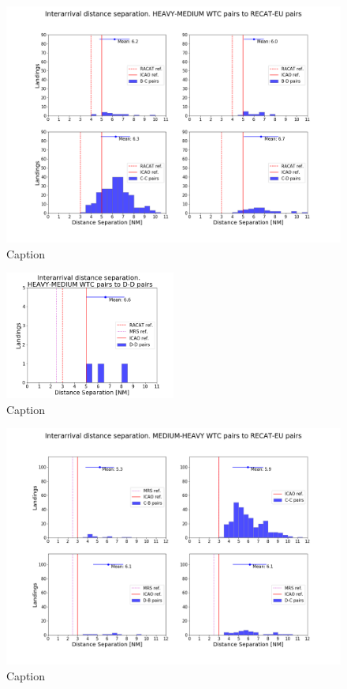\begin{figure}[h]
    \centering
    \includegraphics[width=1\textwidth]{graphics/fig_HM_to_RECAT_pairs_dist_separ.png}
    \caption[list of figures caption]{Caption}
    \label{fig:HM_to_RECAT_pairs_dist_separ}
\end{figure}

\begin{figure}[h]
    \centering
    \includegraphics[width=0.5\textwidth]{graphics/fig_HM_to_DD_pairs_dist_separ.png}
    \caption[list of figures caption]{Caption}
    \label{fig:HM_to_DD_pairs_dist_separ}
\end{figure}



\begin{figure}[h]
    \centering
    \includegraphics[width=1\textwidth]{graphics/fig_MH_to_RECAT_pairs_dist_separ.png}
    \caption[list of figures caption]{Caption}
    \label{fig:MH_to_RECAT_pairs_dist_separ}
\end{figure}

